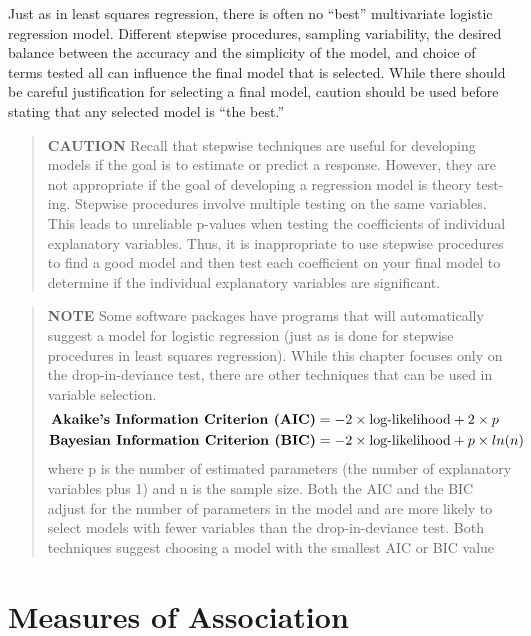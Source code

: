 \documentclass[
]{book}
\begin{document}
Just as in least squares regression, there is often no ``best'' multivariate logistic regression model. Different stepwise procedures, sampling variability, the desired balance between the accuracy and the simplicity of the model, and choice of terms tested all can influence the final model that is selected. While there should be careful justification for selecting a final model, caution should be used before stating that any selected model is ``the best.''

\begin{quote}
\textbf{CAUTION}
Recall that stepwise techniques are useful for developing models if the goal is to estimate or predict a
response. However, they are not appropriate if the goal of developing a regression model is theory test-
ing. Stepwise procedures involve multiple testing on the same variables. This leads to unreliable p-values when testing the coefficients of individual explanatory variables. Thus, it is inappropriate to use stepwise procedures to find a good model and then test each coefficient on your final model to determine if the individual explanatory variables are significant.
\end{quote}

\begin{quote}
\textbf{NOTE}
Some software packages have programs that will automatically suggest a model for logistic regression
(just as is done for stepwise procedures in least squares regression). While this chapter focuses only on the drop-in-deviance test, there are other techniques that can be used in variable selection.
\begin{align}
\textbf{Akaike’s Information Criterion (AIC)} &= -2 \times \text{log-likelihood} + 2 \times p \notag \\
\textbf{Bayesian Information Criterion (BIC)} &= -2 \times \text{log-likelihood} + p \times ln(n) \notag
\end{align}
where p is the number of estimated parameters (the number of explanatory variables plus 1) and n is the
sample size. Both the AIC and the BIC adjust for the number of parameters in the model and are more
likely to select models with fewer variables than the drop-in-deviance test. Both techniques suggest choosing a model with the smallest AIC or BIC value
\end{quote}

\hypertarget{measures-of-association}{%
\section{Measures of Association}\label{measures-of-association}}
\end{document}
